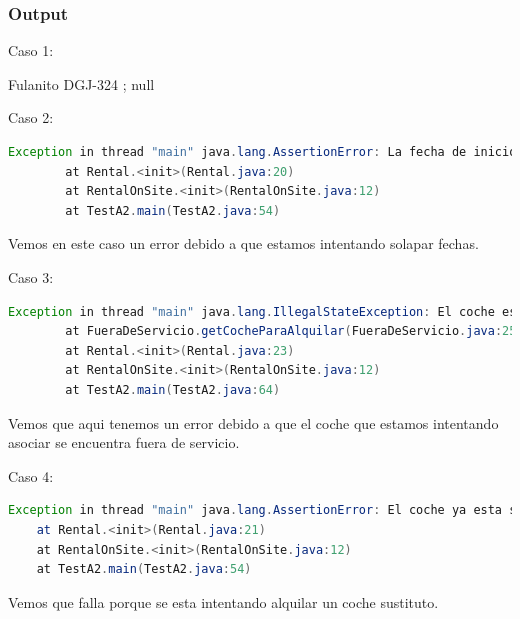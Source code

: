 \subsubsection*{Output}
Caso 1: \par
\vspace{0.15cm}
Fulanito DGJ-324 ; null\par
\vspace{0.15cm}
Caso 2:\par
\vspace{0.15cm}
\begin{lstlisting}[style = javaNormal, language=Java] 
Exception in thread "main" java.lang.AssertionError: La fecha de inicio no es valida
        at Rental.<init>(Rental.java:20)
        at RentalOnSite.<init>(RentalOnSite.java:12)
        at TestA2.main(TestA2.java:54)
\end{lstlisting}
\vspace{0.15cm}
Vemos en este caso un error debido a que estamos intentando solapar fechas.\par
Caso 3:\par
\vspace{0.15cm}
\begin{lstlisting}[style = javaNormal, language=Java] 
Exception in thread "main" java.lang.IllegalStateException: El coche esta fuera de servicio y no tiene sustituto 
        at FueraDeServicio.getCocheParaAlquilar(FueraDeServicio.java:25)
        at Rental.<init>(Rental.java:23)
        at RentalOnSite.<init>(RentalOnSite.java:12)
        at TestA2.main(TestA2.java:64)
\end{lstlisting}
\vspace{0.15cm}
Vemos que aqui tenemos un error debido a que el coche que estamos intentando asociar se encuentra fuera de servicio.\par
Caso 4:\par
\vspace{0.15cm}
\begin{lstlisting}[style = javaNormal, language=Java]     
Exception in thread "main" java.lang.AssertionError: El coche ya esta siendo usado como sustituto.
	at Rental.<init>(Rental.java:21)
	at RentalOnSite.<init>(RentalOnSite.java:12)
	at TestA2.main(TestA2.java:54)
\end{lstlisting}
Vemos que falla porque se esta intentando alquilar un coche sustituto.\par
\newpage